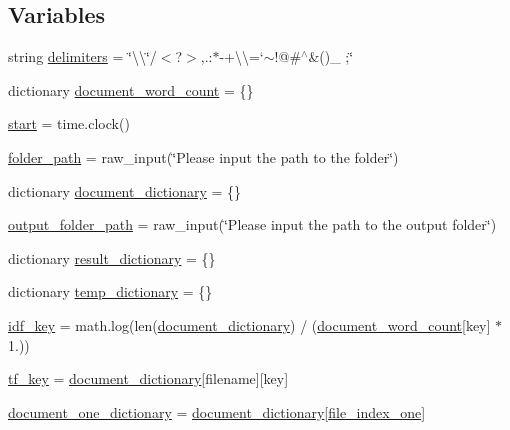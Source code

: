 \subsection*{Variables}
\begin{DoxyCompactItemize}
\item 
string \hyperlink{namespacediff_a46e2544bf0f797b8d42f4985d4b9bf0a}{delimiters} = \char`\"{}\textbackslash{}\textquotesingle{}\textbackslash{}\char`\"{}/$<$?$>$,.\+:$\ast$-\/+\textbackslash{}\textbackslash{}=`$\sim$!@\#$^\wedge$\&()\+\_\+ ;\char`\"{}
\item 
dictionary \hyperlink{namespacediff_af16edaaafe4787892cb925870fd0d108}{document\+\_\+word\+\_\+count} = \{\}
\item 
\hyperlink{namespacediff_ac1dbbabcf481dbdd8253f435c6841b59}{start} = time.\+clock()
\item 
\hyperlink{namespacediff_adccd64c100d50ed0e87d46c33e8636eb}{folder\+\_\+path} = raw\+\_\+input(\char`\"{}Please input the path to the folder\char`\"{})
\item 
dictionary \hyperlink{namespacediff_a7d02a567fcd601900d3960bef0191cea}{document\+\_\+dictionary} = \{\}
\item 
\hyperlink{namespacediff_aed454348ccff9ceb835a6c22de15fa95}{output\+\_\+folder\+\_\+path} = raw\+\_\+input(\char`\"{}Please input the path to the output folder\char`\"{})
\item 
dictionary \hyperlink{namespacediff_a08d29f91abd1bc75aa7d8ecb3aa39c91}{result\+\_\+dictionary} = \{\}
\item 
dictionary \hyperlink{namespacediff_aca04823d91158ba2b053d46e3550516d}{temp\+\_\+dictionary} = \{\}
\item 
\hyperlink{namespacediff_a1798972d3d6361a79c16d8470bf3471d}{idf\+\_\+key} = math.\+log(len(\hyperlink{namespacediff_a7d02a567fcd601900d3960bef0191cea}{document\+\_\+dictionary}) / (\hyperlink{namespacediff_af16edaaafe4787892cb925870fd0d108}{document\+\_\+word\+\_\+count}\mbox{[}key\mbox{]} $\ast$ 1.))
\item 
\hyperlink{namespacediff_ab860e167471d632882c770f12e87927e}{tf\+\_\+key} = \hyperlink{namespacediff_a7d02a567fcd601900d3960bef0191cea}{document\+\_\+dictionary}\mbox{[}filename\mbox{]}\mbox{[}key\mbox{]}
\item 
\hyperlink{namespacediff_aa4da046a613de2dafe03d105bca31694}{document\+\_\+one\+\_\+dictionary} = \hyperlink{namespacediff_a7d02a567fcd601900d3960bef0191cea}{document\+\_\+dictionary}\mbox{[}\hyperlink{namespacediff_ac8ee8a35e457d5004c0f85b0383faf26}{file\+\_\+index\+\_\+one}\mbox{]}

\end{DoxyCompactItemize}
